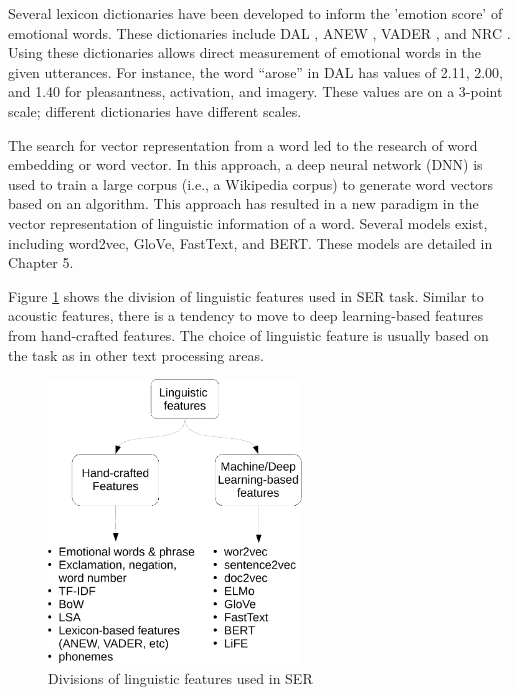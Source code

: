 Several lexicon dictionaries have been developed to inform the 'emotion score'
of emotional words. These dictionaries include DAL \cite{Whissell2009}, ANEW
\cite{Warriner2013}, VADER \cite{Hutto2014}, and NRC \cite{Mohammad2018}. Using
these dictionaries allows direct measurement of emotional words in the given
utterances. For instance, the word ``arose'' in DAL has values of 2.11, 2.00,
and 1.40 for pleasantness, activation, and imagery. These values are on a
3-point scale; different dictionaries have different scales.

The search for vector representation from a word led to the research of word
embedding or word vector. In this approach, a deep neural network (DNN) is used
to train a large corpus (i.e., a Wikipedia corpus) to generate word vectors
based on an algorithm. This approach has resulted in a new paradigm in the
vector representation of linguistic information of a word. Several models
exist, including word2vec, GloVe, FastText, and BERT. These models are detailed
in Chapter 5.

Figure \ref{fig:ling_feat} shows the division of linguistic features used in
SER task. Similar to acoustic features, there is a tendency to move to deep
learning-based features from hand-crafted features. The choice of linguistic
feature is usually based on the task as in other text processing areas.

\begin{figure}[htbp]
    \centering
    \includegraphics[width=0.6\textwidth]{../fig/linguistic_features-crop.pdf}
    \caption{Divisions of linguistic features used in SER}
    \label{fig:ling_feat}
\end{figure}

